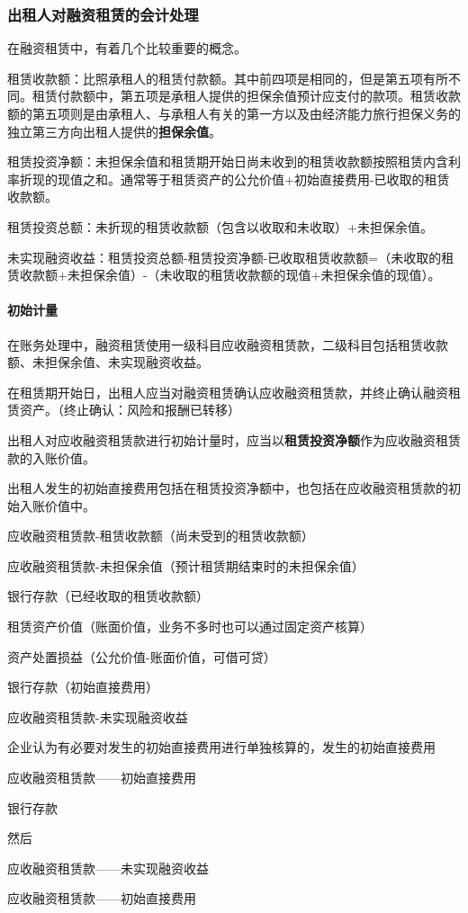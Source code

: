 \documentclass[UTF8,12pt]{ctexart}
\newenvironment{Dr}{%
	\begin{list}{}%
		{
			\setlength{\leftmargin}{2em}
			\setlength{\labelwidth}{2em}
			\setlength{\labelsep}{0pt}
			\setlength{\itemindent}{0pt}
			\setlength{\listparindent}{0pt}
			\setlength{\parsep}{0pt}
			\setlength{\topsep}{0pt}
		}
		\item[\textbf{借：}]
	}{%
	\end{list}
}
\newenvironment{Cr}{%
	\begin{list}{}%
		{
			\setlength{\leftmargin}{3em}
			\setlength{\labelwidth}{2em}
			\setlength{\labelsep}{0pt}
			\setlength{\itemindent}{0pt}
			\setlength{\listparindent}{0pt}
			\setlength{\parsep}{0pt}
			\setlength{\topsep}{0pt}
		}
		\item[\textbf{贷：}]
	}{%
	\end{list}
}
\numberwithin{equation}{section} %
\numberwithin{figure}{section}
\numberwithin{table}{section}
\begin{document}
	\subsubsection{出租人对融资租赁的会计处理}
	在融资租赁中，有着几个比较重要的概念。
	
	租赁收款额：比照承租人的租赁付款额。其中前四项是相同的，但是第五项有所不同。租赁付款额中，第五项是承租人提供的担保余值预计应支付的款项。租赁收款额的第五项则是由承租人、与承租人有关的第一方以及由经济能力旅行担保义务的独立第三方向出租人提供的\textbf{担保余值}。
	
	租赁投资净额：未担保余值和租赁期开始日尚未收到的租赁收款额按照租赁内含利率折现的现值之和。通常等于租赁资产的公允价值+初始直接费用-已收取的租赁收款额。
	
	租赁投资总额：未折现的租赁收款额（包含以收取和未收取）+未担保余值。
	
	未实现融资收益：租赁投资总额-租赁投资净额-已收取租赁收款额=（未收取的租赁收款额+未担保余值）-（未收取的租赁收款额的现值+未担保余值的现值）。
	
	\paragraph{初始计量}在账务处理中，融资租赁使用一级科目应收融资租赁款，二级科目包括租赁收款额、未担保余值、未实现融资收益。
	
	在租赁期开始日，出租人应当对融资租赁确认应收融资租赁款，并终止确认融资租赁资产。（终止确认：风险和报酬已转移）
	
	出租人对应收融资租赁款进行初始计量时，应当以\textbf{租赁投资净额}作为应收融资租赁款的入账价值。
	
	出租人发生的初始直接费用包括在租赁投资净额中，也包括在应收融资租赁款的初始入账价值中。
	\begin{Dr}
		应收融资租赁款-租赁收款额（尚未受到的租赁收款额）
		
		应收融资租赁款-未担保余值（预计租赁期结束时的未担保余值）
		
		银行存款（已经收取的租赁收款额）
	\end{Dr}
	\begin{Cr}
		租赁资产价值（账面价值，业务不多时也可以通过固定资产核算）
		
		资产处置损益（公允价值-账面价值，可借可贷）
		
		银行存款（初始直接费用）
		
		应收融资租赁款-未实现融资收益
	\end{Cr}

	企业认为有必要对发生的初始直接费用进行单独核算的，发生的初始直接费用
	\begin{Dr}
		应收融资租赁款——初始直接费用
	\end{Dr}
	\begin{Cr}
		银行存款
	\end{Cr}
	然后
	\begin{Dr}
		应收融资租赁款——未实现融资收益
	\end{Dr}
	\begin{Cr}
		应收融资租赁款——初始直接费用
	\end{Cr}
	
\end{document}
